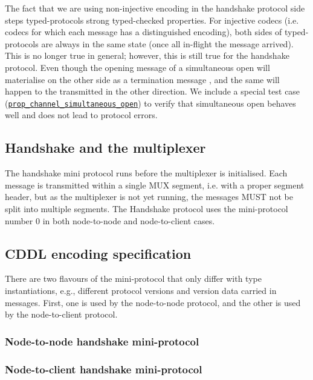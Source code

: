 The fact that we are using non-injective encoding in the handshake protocol
side steps typed-protocols strong typed-checked properties.  For injective
codecs (i.e. codecs for which each message has a distinguished encoding), both
sides of typed-protocols are always in the same state (once all in-flight
the message arrived).  This is no longer true in general; however, this is still
true for the handshake protocol.  Even though the opening message
\MsgProposeVersions{} of a simultaneous open will materialise on the
other side as a termination message \MsgReplyVersions{}, and the same will
happen to the \MsgProposeVersions{} transmitted in the other direction.
We include a special test case
(\href{https://github.com/intersectmbo/ouroboros-network/blob/master/ouroboros-network/protocol-tests/Ouroboros/Network/Protocol/Handshake/Test.hs\#L551}{\texttt{prop\_channel\_simultaneous\_open}})
to verify that simultaneous open behaves well and does not lead to protocol
errors.

\subsection{Handshake and the multiplexer}

The handshake mini protocol runs before the multiplexer is initialised.
Each message is transmitted within a single MUX segment, i.e. with a proper
segment header, but as the multiplexer is not yet running, the messages MUST not
be split into multiple segments.  The Handshake protocol uses the
mini-protocol number $0$ in both node-to-node and node-to-client cases.

\subsection{CDDL encoding specification}\label{handshake-cddl}
There are two flavours of the mini-protocol that only differ with type
instantiations, e.g., different protocol versions and version data carried in
messages.  First, one is used by the node-to-node protocol, and the other is used by the
node-to-client protocol.
\subsubsection{Node-to-node handshake mini-protocol}


\subsubsection{Node-to-client handshake mini-protocol}


